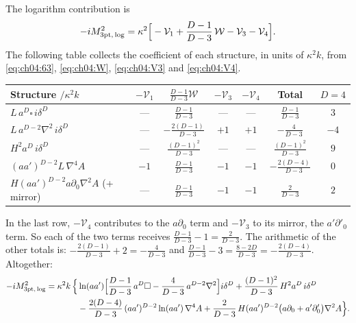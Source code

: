 The logarithm contribution is
\begin{equation}
-iM^2_{\rm 3pt,\,log}=\kappa^2\Big[-\mathcal V_1+\frac{D-1}{D-3}\,\mathcal W-\mathcal V_3-\mathcal V_4\Big].
\end{equation}
The following table collects the coefficient of each structure, in units of $\kappa^2k$, from \eqref{eq:ch04:63}, \eqref{eq:ch04:W}, \eqref{eq:ch04:V3} and \eqref{eq:ch04:V4}.
\begin{center}
\small
\renewcommand{\arraystretch}{1.45}
\begin{tabular}{@{}lcccccc@{}}
\toprule
Structure $/\kappa^2k$ & $-\mathcal V_1$ & $\frac{D-1}{D-3}\mathcal W$ & $-\mathcal V_3$ & $-\mathcal V_4$ & Total & $D=4$\\
\midrule
$L\,a^D\square\,i\delta^D$ & --- & $\frac{D-1}{D-3}$ & --- & --- & $\frac{D-1}{D-3}$ & $3$\\
$L\,a^{D-2}\nabla^2\,i\delta^D$ & --- & $-\frac{2(D-1)}{D-3}$ & $+1$ & $+1$ & $-\frac{4}{D-3}$ & $-4$\\
$H^2a^D\,i\delta^D$ & --- & $\frac{(D-1)^2}{D-3}$ & --- & --- & $\frac{(D-1)^2}{D-3}$ & $9$\\
$(aa')^{D-2}L\,\nabla^4A$ & $-1$ & $\frac{D-1}{D-3}$ & $-1$ & $-1$ & $-\frac{2(D-4)}{D-3}$ & $0$\\
$H(aa')^{D-2}a\partial_0\nabla^2A$ (+ mirror) & --- & $\frac{D-1}{D-3}$ & $-1$ & $-1$ & $\frac{2}{D-3}$ & $2$\\
\bottomrule
\end{tabular}
\end{center}
In the last row, $-\mathcal V_4$ contributes to the $a\partial_0$ term and $-\mathcal V_3$ to its mirror, the $a'\partial'_0$ term.
So each of the two terms receives $\frac{D-1}{D-3}-1=\frac{2}{D-3}$.
The arithmetic of the other totals is:
$-\frac{2(D-1)}{D-3}+2=-\frac{4}{D-3}$ and $\frac{D-1}{D-3}-3=\frac{8-2D}{D-3}=-\frac{2(D-4)}{D-3}$.
Altogether:
\begin{equation}
\begin{aligned}
-iM^2_{\rm 3pt,\,log}=\kappa^2k\,\Big\{&\ln(aa')\Big[\frac{D-1}{D-3}\,a^D\square-\frac{4}{D-3}\,a^{D-2}\nabla^2\Big]i\delta^D+\frac{(D-1)^2}{D-3}\,H^2a^D\,i\delta^D\\
&-\frac{2(D-4)}{D-3}\,(aa')^{D-2}\ln(aa')\,\nabla^4A+\frac{2}{D-3}\,H(aa')^{D-2}\big(a\partial_0+a'\partial'_0\big)\nabla^2A\Big\}.
\end{aligned}
\label{eq:ch04:67D}
\end{equation}

